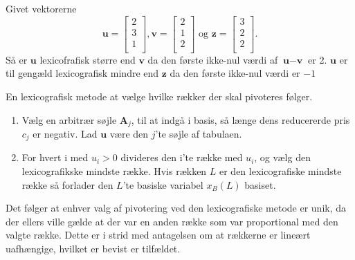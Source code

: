 \begin{eks}\label{eks:lexi}
Givet vektorerne
$$\textbf{u}=
\begin{bmatrix}
2\\
3\\
1\\
\end{bmatrix}
,
\textbf{v}=
\begin{bmatrix}
2\\
1\\
2\\
\end{bmatrix}
\text{ og }
\textbf{z}=
\begin{bmatrix}
3\\
2\\
2\\
\end{bmatrix}
.$$
Så er $\textbf{u}$ lexicofrafisk større end $\textbf{v}$ da den første ikke-nul værdi af $\textbf{u}-\textbf{v}$ er 2.
$\textbf{u}$ er til gengæld lexicografisk mindre end $\textbf{z}$ da den første ikke-nul værdi er $-1$
\end{eks}
En lexicografisk metode at vælge hvilke rækker der skal pivoteres følger.
\begin{enumerate}
\item Vælg en arbitrær søjle $\textbf{A}_j$, til at indgå i basis, så længe dens reducererde pris $c_j$ er negativ.
Lad $\textbf{u}$ være den $j$'te søjle af tabulaen.
\item For hvert i med $u_i>0$ divideres den i'te række med $u_i$, og vælg den lexicografikske mindste række. Hvis rækken $L$ er den lexicografiske mindste række så forlader den $L$'te basiske variabel $x_B(L)$ basiset.
\end{enumerate}
Det følger at enhver valg af pivotering ved den lexicografiske metode er unik, da der ellers ville gælde at der var en anden række som var proportional med den valgte række. Dette er i strid med antagelsen om at rækkerne er lineært uafhængige, hvilket er bevist er tilfældet.

